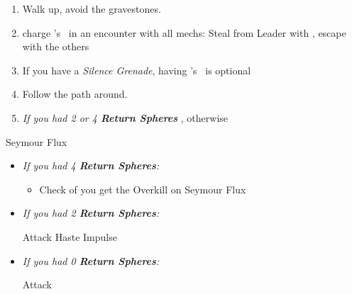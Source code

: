 \begin{enumerate}[resume]
    \item Walk up, avoid the gravestones.
    \item charge \rikku's \od\ in an encounter with all mechs: Steal from Leader with \rikku, escape with the others
    \item If you have a \textit{Silence Grenade}, having \rikku's \od\ is optional
    \item Follow the path around.
    \item \textit{If you had 2 or 4 \textbf{Return Spheres}} \formation{\tidus}{\yuna}{\auron}, otherwise \formation{\tidus}{\kimahri}{\wakka}
\end{enumerate}
\begin{battle}[70000]{Seymour Flux}
    \begin{itemize}
        \item \textit{If you had 4 \textbf{Return Spheres}:}
        \begin{itemize}
            \yunaf Attack
            \tidusf Haste \yuna
            \switch{\auron}{\rikku}
            \rikkuf \od\ HP Sphere + Grenade or \textbf{Use} Silence Grenade
            \summon{\bahamut}
            \bahamutf \textit{If you used a Silence Grenade} Impulse, otherwise Attack
            \enemyf Banishes Bahamut
            \yunaf Attack
            \tidusf \textit{If you used a Silence Grenade} Attack once, otherwise Defend
            \rikkuf Defend
            \item Check of you get the Overkill on Seymour Flux
        \end{itemize}
        \item \textit{If you had 2 \textbf{Return Spheres}:}
        \begin{itemize}
            \yunaf Attack
            \tidusf Haste \yuna
            \summon{\bahamut}
            \bahamutf Impulse
        \end{itemize}
        \item \textit{If you had 0 \textbf{Return Spheres}:}
        \begin{itemize}
            \switch{\tidus}{\yuna}
            \summon{\bahamut}
            \bahamutf Attack
        \end{itemize}
    \end{itemize}
\end{battle}
